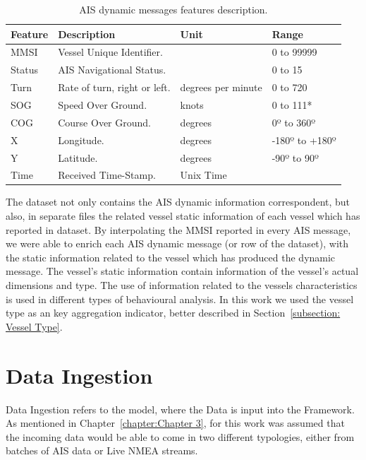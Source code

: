 \begin{table}[H]
\centering
\caption{AIS dynamic messages features description.}
\label{Table: Data-Set Features}
\begin{tabular}{@{}llll@{}}
\toprule
Feature & Description                  & Unit               & Range          \\ \midrule
MMSI    & Vessel Unique Identifier.     &                    & 0 to 99999     \\
Status  & AIS Navigational Status.     &                    & 0 to 15        \\
Turn    & Rate of turn, right or left. & degrees per minute & 0 to 720       \\
SOG     & Speed Over Ground.           & knots              & 0 to 111*      \\
COG     & Course Over Ground.          & degrees            & 0º to 360º     \\
X       & Longitude.                   & degrees            & -180º to +180º \\
Y       & Latitude.                    & degrees            & -90º to 90º    \\
Time    & Received Time-Stamp.         & Unix Time          &                \\ \bottomrule
\end{tabular}
\end{table}

The dataset not only contains the AIS dynamic information correspondent, but also, in separate files the related vessel static information of each vessel which has reported in dataset. By interpolating the MMSI reported in every AIS message, we were able to enrich each AIS dynamic message (or row of the dataset), with the static information related to the vessel which has produced the dynamic message. The vessel's static information contain information of the vessel's actual dimensions and type. The use of information related to the vessels characteristics is used in different types of behavioural analysis. In this work we used the vessel type as an key aggregation indicator, better described in Section~\ref{subsection: Vessel Type}.

\section{Data Ingestion}
\label{subsection: ch4 Data Ingestion}
Data Ingestion refers to the model, where the Data is input into the Framework. As mentioned in Chapter~\ref{chapter:Chapter 3}, for this work was assumed that the incoming data would be able to come in two different typologies, either from batches of AIS data or Live NMEA streams. 

